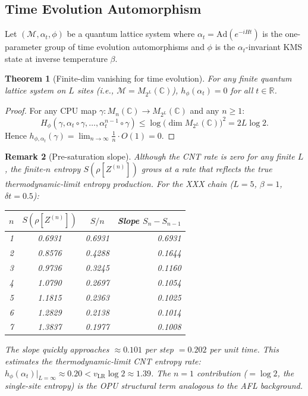 \documentclass[12pt,a4paper]{article}
\newtheorem{theorem}{Theorem}[section]
\newtheorem{remark}[theorem]{Remark}
\newcommand{\CC}{\mathbb{C}}
\newcommand{\RR}{\mathbb{R}}
\newcommand{\Mn}{M_n(\CC)}
\newcommand{\vN}{\mathcal{M}}      %
\newcommand{\Hphi}{H_{\phi}}
\begin{document}
\subsection{Time Evolution Automorphism}

Let $(\vN,\alpha_t,\phi)$ be a quantum lattice system where
$\alpha_t = \mathrm{Ad}(e^{-iHt})$ is the one-parameter group of time evolution
automorphisms and $\phi$ is the $\alpha_t$-invariant KMS state at inverse temperature $\beta$.

\begin{theorem}[Finite-dim vanishing for time evolution]\label{thm:finite_time}
For any finite quantum lattice system on $L$ sites (i.e., $\vN=M_{2^L}(\CC)$),
$h_\phi(\alpha_t)=0$ for all $t\in\RR$.
\end{theorem}

\begin{proof}
For any CPU map $\gamma:\Mn\to M_{2^L}(\CC)$ and any $n\ge 1$:
\begin{equation}
  \Hphi(\gamma,\alpha_t\circ\gamma,\ldots,\alpha_t^{n-1}\circ\gamma)
  \le \log\bigl(\dim M_{2^L}(\CC)\bigr)^2
  = 2L\log 2.
\end{equation}
Hence $h_{\phi,\alpha_t}(\gamma) = \lim_{n\to\infty}\frac{1}{n}\cdot O(1)=0$.
\end{proof}

\begin{remark}[Pre-saturation slope]
Although the CNT rate is zero for any finite $L$, the finite-$n$ entropy
$S(\rho[Z^{(n)}])$ grows at a rate that reflects the true thermodynamic-limit
entropy production.  For the XXX chain ($L=5$, $\beta=1$, $\delta t=0.5$):
\begin{center}
\begin{tabular}{@{}cccr@{}}
\toprule
$n$ & $S(\rho[Z^{(n)}])$ & $S/n$ & Slope $S_n-S_{n-1}$ \\
\midrule
1 & 0.6931 & 0.6931 & 0.6931 \\
2 & 0.8576 & 0.4288 & 0.1644 \\
3 & 0.9736 & 0.3245 & 0.1160 \\
4 & 1.0790 & 0.2697 & 0.1054 \\
5 & 1.1815 & 0.2363 & 0.1025 \\
6 & 1.2829 & 0.2138 & 0.1014 \\
7 & 1.3837 & 0.1977 & 0.1008 \\
\bottomrule
\end{tabular}
\end{center}
The slope quickly approaches $\approx 0.101$ per step $= 0.202$ per unit time.
This estimates the thermodynamic-limit CNT entropy rate:
$h_\phi(\alpha_t)|_{L=\infty} \approx 0.20 < v_\mathrm{LR}\log 2\approx 1.39$.
The $n=1$ contribution ($= \log 2$, the single-site entropy) is the OPU structural term
analogous to the AFL background.
\end{remark}
\end{document}
